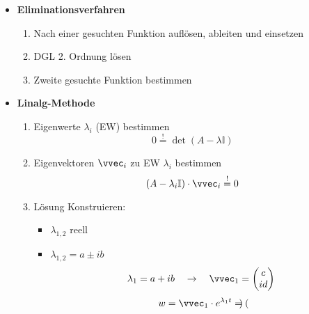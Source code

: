    \begin{itemize}
        \item \textbf{Eliminationsverfahren}
            \begin{enumerate}
                \item Nach einer gesuchten Funktion auflösen, ableiten und einsetzen
                \item DGL 2. Ordnung lösen
                \item Zweite gesuchte Funktion bestimmen
            \end{enumerate}
        \item \textbf{Linalg-Methode}
            \begin{enumerate}
                \item Eigenwerte $\lambda_i$ (EW) bestimmen
                    $$
                        0 \overset{!}{=} \det (A - \lambda \mathbb{I})
                    $$
                \item Eigenvektoren $\vvec_i$ zu EW $\lambda_i$ bestimmen
                    $$
                        (A - \lambda_i \mathbb{I}) \cdot \vvec_i \overset{!}{=} 0
                    $$
                \item Lösung Konstruieren:
                \begin{itemize}
                    \item $\lambda_{1,2}$ reell
                    \item $\lambda_{1,2} = a \pm ib$ 
                        $$
                            \lambda_{1} = a + ib \quad \to \quad \vvec_1 =
                            \begin{pmatrix}
                                c\\id
                            \end{pmatrix}
                        $$
                        $$
                            w = 
                            \vvec_1 \cdot e^{\lambda_1 t}
                            =
                            \begin{pmatrix}

\end{pmatrix}$$
\end{itemize}
\end{enumerate}
\end{itemize}
